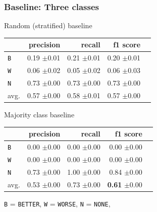 \documentclass[11pt,aspectratio=169]{beamer}
\begin{document}
    \begin{frame}
        \frametitle{Baseline: Three classes}

        \begin{minipage}{.5\linewidth}
            \caption{Random (stratified) baseline}
            \label{tbl:3stratifiedbaseline}
            \centering

            \begin{tabularx}{0.97\linewidth}{Xrrrr}
                \toprule
                & precision & recall & f1 score                     \\ \midrule
                \texttt{B} & 0.19 \scriptsize{$\pm$0.01} & 0.21 \scriptsize{$\pm$0.01} & 0.20 \scriptsize{$\pm$0.01} \\
                \texttt{W}  & 0.06 \scriptsize{$\pm$0.02} & 0.05 \scriptsize{$\pm$0.02} & 0.06 \scriptsize{$\pm$0.03} \\
                \texttt{N}   & 0.73 \scriptsize{$\pm$0.00}  & 0.73 \scriptsize{$\pm$0.00} & 0.73 \scriptsize{$\pm$0.00} \\
                avg. & 0.57 \scriptsize{$\pm$0.00} & 0.58 \scriptsize{$\pm$0.01} & 0.57 \scriptsize{$\pm$0.00} \\
                \bottomrule
            \end{tabularx}

        \end{minipage}%
        \begin{minipage}{.5\linewidth}
            \centering
            \caption{Majority class baseline}
            \label{tbl:3majoritybaseline}
            \begin{tabularx}{0.97\linewidth}{Xrrrr}
                \toprule
                & precision & recall & f1 score                                    \\ \midrule
                \texttt{B} & 0.00 \scriptsize{$\pm$0.00} & 0.00 \scriptsize{$\pm$0.00} & 0.00 \scriptsize{$\pm$0.00}                \\
                \texttt{W}  & 0.00 \scriptsize{$\pm$0.00} & 0.00 \scriptsize{$\pm$0.00} & 0.00 \scriptsize{$\pm$0.00}                \\
                \texttt{N}   & 0.73 \scriptsize{$\pm$0.00}     & 1.00 \scriptsize{$\pm$0.00} & 0.84 \scriptsize{$\pm$0.00}                \\
                avg. & 0.53 \scriptsize{$\pm$0.00} & 0.73 \scriptsize{$\pm$0.00} & \textbf{0.61} \scriptsize{$\pm$0.00} \\
                \bottomrule
            \end{tabularx}
        \end{minipage}\newline\newline
        \texttt{B} = \texttt{BETTER}, \texttt{W} = \texttt{WORSE}, \texttt{N} = \texttt{NONE},
    \end{frame}
\end{document}
